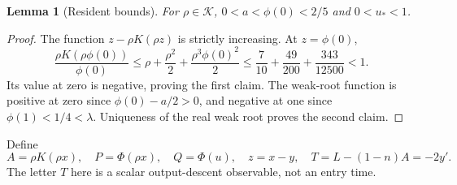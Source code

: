 \documentclass[11pt]{article}
\numberwithin{equation}{section}
\newtheorem{lemma}[theorem]{Lemma}
\theoremstyle{remark}\newtheorem{remark}[theorem]{Remark}
\newcommand{\1}{\mathbf 1}
\begin{document}
\begin{lemma}[Resident bounds]\label{inc:AN06:v1:residentbounds}
For $\rho\in\mathcal K$, $0<a<\phi(0)<2/5$ and $0<u_*<1$.
\end{lemma}
\begin{proof}
The function $z-\rho K(\rho z)$ is strictly increasing. At $z=\phi(0)$,
\[
 \frac{\rho K(\rho\phi(0))}{\phi(0)}
 \le\rho+\frac{\rho^2}{2}+\frac{\rho^3\phi(0)^2}{2}
 \le\frac7{10}+\frac{49}{200}+\frac{343}{12500}<1.
\]
Its value at zero is negative, proving the first claim. The weak-root
function is positive at zero since $\phi(0)-a/2>0$, and negative at one
since $\phi(1)<1/4<\lambda$. Uniqueness of the real weak root proves the
second claim.
\end{proof}

Define
\begin{equation}\label{inc:AN06:v1:TZ}
 A=\rho K(\rho x),\quad P=\Phi(\rho x),\quad Q=\Phi(u),\quad
 z=x-y,\quad T=L-(1-n)A=-2y'.
\end{equation}
The letter $T$ here is a scalar output-descent observable, not an entry time.
\end{document}
